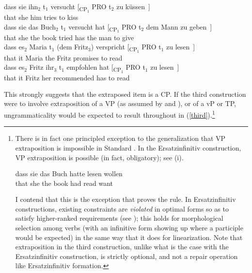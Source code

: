 \documentclass[output=paper]{langsci/langscibook}
\begin{document}
\ea\label{third} 
    \ea \gll dass \label{22a}sie ihn$_2$ t$_1$ versucht [\textsubscript{CP$_1$} PRO t$_2$ zu küssen~]\\
    that she\textsubscript{\Nom} him\textsubscript{\Acc} {} tries {} {} {} to kiss\\
    \ex \gll dass sie \label{22b}das Buch$_2$ t$_1$ versucht  hat [\textsubscript{CP$_1$} PRO t$_2$ dem Mann zu geben~]\\
    that she\textsubscript{\Nom} the book {} tried has {} {} {} the man\textsubscript{\Dat} to give\\
    \ex \gll dass es$_2$ Maria \label{2co}t$_1$ (dem Fritz$_3$) verspricht [\textsubscript{CP$_1$} PRO t$_1$ zu lesen~]\\
    that it\textsubscript{\Acc} Maria {} \phantom{(}the Fritz\textsubscript{\Dat} promises {} {} {} to read\\
    \ex \gll dass es$_2$ Fritz ihr$_3$ t$_1$ \label{3co}empfohlen hat [\textsubscript{CP$_1$} PRO t$_1$ zu lesen~]\\
    that it\textsubscript{\Acc} Fritz\textsubscript{\Nom} her\textsubscript{\Dat} {} recommended has {} {} {} to read\\
    \z
\z

\largerpage[-2]
This strongly suggests that the extraposed item is a CP. If the third
construction were to involve extraposition of a VP (as assumed by
\citealt{Woellstein:01} and \citealt{Haider:10}), or of a vP or TP,
ungrammaticality would be expected to result throughout in
(\ref{third}).\footnote{There is in fact one principled exception to the
    generalization that VP extraposition is impossible in Standard . In
    the Ersatzinfinitiv construction, VP extraposition is possible (in fact,
    obligatory); see (i).

\begin{exe}
    \gll dass sie das Buch  hatte lesen wollen\\
that she\textsubscript{\Nom} the book\textsubscript{\Acc} had read want\\
\end{exe}

I contend that this is the exception that proves the rule. In Ersatzinfinitiv
constructions, existing constraints are {\it violated} in optimal forms so as
to satisfy higher-ranked requirements (see \citealt{Schmid:05}); this holds for
morphological selection among verbs (with an infinitive form showing up where a
participle would be expected) in the same way that it does for linearization.
Note that extraposition in the third construction, unlike what is the case with
the Ersatzinfinitiv construction, is strictly optional, and not a repair
operation like Ersatzinfinitiv formation.}
\end{document}
